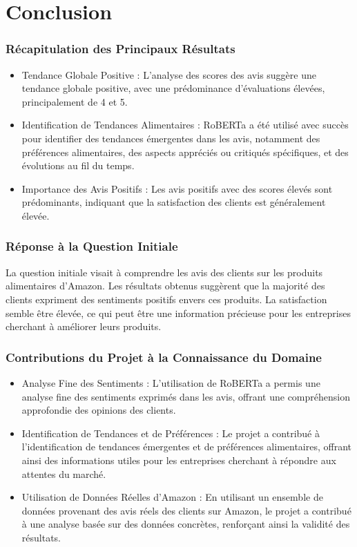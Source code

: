 \section{Conclusion}

\begin{frame}
    \frametitle{Récapitulation des Principaux Résultats}
    \begin{itemize}
        \item Tendance Globale Positive : L'analyse des scores des avis suggère une tendance globale positive, avec une prédominance d'évaluations élevées, principalement de 4 et 5.
        \item Identification de Tendances Alimentaires : RoBERTa a été utilisé avec succès pour identifier des tendances émergentes dans les avis, notamment des préférences alimentaires, des aspects appréciés ou critiqués spécifiques, et des évolutions au fil du temps.
        \item Importance des Avis Positifs : Les avis positifs avec des scores élevés sont prédominants, indiquant que la satisfaction des clients est généralement élevée.
    \end{itemize}
\end{frame}

\begin{frame}
    \frametitle{Réponse à la Question Initiale}
    La question initiale visait à comprendre les avis des clients sur les produits alimentaires d'Amazon. Les résultats obtenus suggèrent que la majorité des clients expriment des sentiments positifs envers ces produits. La satisfaction semble être élevée, ce qui peut être une information précieuse pour les entreprises cherchant à améliorer leurs produits.
\end{frame}

\begin{frame}
    \frametitle{Contributions du Projet à la Connaissance du Domaine}
    \begin{itemize}
        \item Analyse Fine des Sentiments : L'utilisation de RoBERTa a permis une analyse fine des sentiments exprimés dans les avis, offrant une compréhension approfondie des opinions des clients.
        \item Identification de Tendances et de Préférences : Le projet a contribué à l'identification de tendances émergentes et de préférences alimentaires, offrant ainsi des informations utiles pour les entreprises cherchant à répondre aux attentes du marché.
        \item Utilisation de Données Réelles d'Amazon : En utilisant un ensemble de données provenant des avis réels des clients sur Amazon, le projet a contribué à une analyse basée sur des données concrètes, renforçant ainsi la validité des résultats.
    \end{itemize}
\end{frame}

